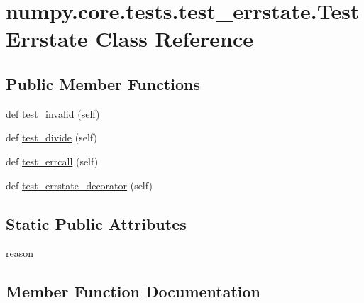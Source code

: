 \hypertarget{classnumpy_1_1core_1_1tests_1_1test__errstate_1_1TestErrstate}{}\section{numpy.\+core.\+tests.\+test\+\_\+errstate.\+Test\+Errstate Class Reference}
\label{classnumpy_1_1core_1_1tests_1_1test__errstate_1_1TestErrstate}
\subsection*{Public Member Functions}
\begin{DoxyCompactItemize}
\item 
def \hyperlink{classnumpy_1_1core_1_1tests_1_1test__errstate_1_1TestErrstate_a3b9b37af5444252b9867b4f8df5afad3}{test\+\_\+invalid} (self)
\item 
def \hyperlink{classnumpy_1_1core_1_1tests_1_1test__errstate_1_1TestErrstate_a1e7dacd5dbfa565023f462bf740d1e06}{test\+\_\+divide} (self)
\item 
def \hyperlink{classnumpy_1_1core_1_1tests_1_1test__errstate_1_1TestErrstate_a05815cf69c615d7fd3488495b6c7acbe}{test\+\_\+errcall} (self)
\item 
def \hyperlink{classnumpy_1_1core_1_1tests_1_1test__errstate_1_1TestErrstate_a02e54c58a9e508771fc2ae22c8f7d72b}{test\+\_\+errstate\+\_\+decorator} (self)
\end{DoxyCompactItemize}
\subsection*{Static Public Attributes}
\begin{DoxyCompactItemize}
\item 
\hyperlink{classnumpy_1_1core_1_1tests_1_1test__errstate_1_1TestErrstate_aa9f35d82d4dd2dfe7530194fb2c383c0}{reason}
\end{DoxyCompactItemize}


\subsection{Member Function Documentation}
\mbox{\label{classnumpy_1_1core_1_1tests_1_1test__errstate_1_1TestErrstate_a1e7dacd5dbfa565023f462bf740d1e06}} 
